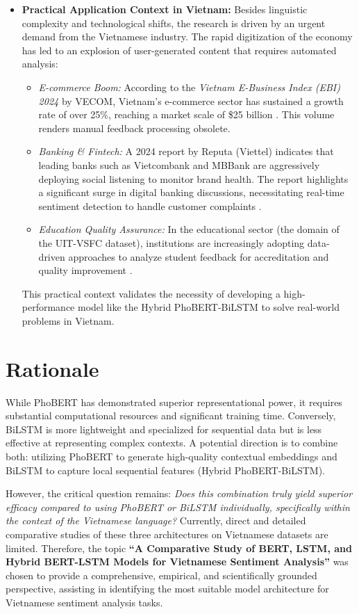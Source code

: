 \documentclass[12pt]{report} %
\begin{document}
\begin{itemize}
    \item \textbf{Practical Application Context in Vietnam:}
    Besides linguistic complexity and technological shifts, the research is driven by an urgent demand from the Vietnamese industry. The rapid digitization of the economy has led to an explosion of user-generated content that requires automated analysis:
    \begin{itemize}
        \item \textit{E-commerce Boom:} According to the \textit{Vietnam E-Business Index (EBI) 2024} by VECOM, Vietnam's e-commerce sector has sustained a growth rate of over 25\%, reaching a market scale of \$25 billion \cite{vecom_2024}. This volume renders manual feedback processing obsolete.
        \item \textit{Banking \& Fintech:} A 2024 report by Reputa (Viettel) indicates that leading banks such as Vietcombank and MBBank are aggressively deploying social listening to monitor brand health. The report highlights a significant surge in digital banking discussions, necessitating real-time sentiment detection to handle customer complaints \cite{reputa_2024}.
        \item \textit{Education Quality Assurance:} In the educational sector (the domain of the UIT-VSFC dataset), institutions are increasingly adopting data-driven approaches to analyze student feedback for accreditation and quality improvement \cite{younet_2023}.
    \end{itemize}
This practical context validates the necessity of developing a high-performance model like the Hybrid PhoBERT-BiLSTM to solve real-world problems in Vietnam.
\end{itemize}

\section{Rationale}

While PhoBERT has demonstrated superior representational power, it requires substantial computational resources and significant training time. Conversely, BiLSTM is more lightweight and specialized for sequential data but is less effective at representing complex contexts. A potential direction is to combine both: utilizing PhoBERT to generate high-quality contextual embeddings and BiLSTM to capture local sequential features (Hybrid PhoBERT-BiLSTM).

However, the critical question remains: \textit{Does this combination truly yield superior efficacy compared to using PhoBERT or BiLSTM individually, specifically within the context of the Vietnamese language?} Currently, direct and detailed comparative studies of these three architectures on Vietnamese datasets are limited. Therefore, the topic \textbf{``A Comparative Study of BERT, LSTM, and Hybrid BERT-LSTM Models for Vietnamese Sentiment Analysis''} was chosen to provide a comprehensive, empirical, and scientifically grounded perspective, assisting in identifying the most suitable model architecture for Vietnamese sentiment analysis tasks.
\end{document}
